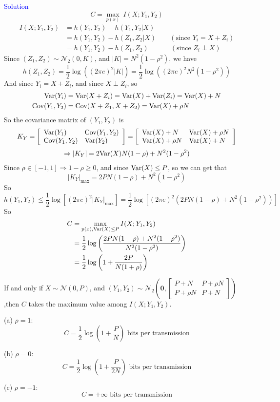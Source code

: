 \textcolor{blue}{Solution}
$$C=\max\limits_{p(x)}\ I(X;Y_1,Y_2)$$
\begin{align*}
I(X;Y_1,Y_2) &= h(Y_1,Y_2) - h(Y_1,Y_2|X) \\
&= h(Y_1,Y_2) - h(Z_1,Z_2|X) \qquad \left(\text{since } Y_i=X+Z_i\right) \\
&= h(Y_1,Y_2) - h(Z_1,Z_2) \qquad\quad\ \left(\text{since } Z_i\perp X\right)
\end{align*}
Since $\left(Z_1,Z_2\right)\sim\mathcal{N}_2(0,K)$, and $|K|=N^2(1-\rho^2)$, we have
$$h(Z_1,Z_2)=\frac{1}{2}\log\left((2\pi e)^2|K|\right)=\frac{1}{2}\log\left((2\pi e)^2 N^2(1-\rho^2)\right)$$
And since $Y_i=X+Z_i$, and since $X\perp Z_i$, so
\begin{align*}
\mathrm{Var}(Y_i) &= \mathrm{Var}(X+Z_i)=\mathrm{Var}(X)+\mathrm{Var}(Z_i)=\mathrm{Var}(X)+N \\
\mathrm{Cov}(Y_1,Y_2) &= \mathrm{Cov}(X+Z_1,X+Z_2)=\mathrm{Var}(X)+\rho N
\end{align*}
So the covariance matrix of $\left(Y_1,Y_2\right)$ is
$$K_Y=\left[\begin{array}{ll}
\mathrm{Var}(Y_1) & \mathrm{Cov}(Y_1,Y_2) \\
\mathrm{Cov}(Y_1,Y_2) & \mathrm{Var}(Y_2)
\end{array}\right]=\left[\begin{array}{ll}
\mathrm{Var}(X)+N & \mathrm{Var}(X)+\rho N \\
\mathrm{Var}(X)+\rho N & \mathrm{Var}(X)+N
\end{array}\right]$$
$$\Rightarrow |K_Y|=2\mathrm{Var}(X)N(1-\rho)+N^2(1-\rho^2)$$
Since $\rho\in[-1,1]\Rightarrow 1-\rho\geq 0$, and since $\mathrm{Var}(X)\leq P$, so we can get that
$$|K_Y|_{\max}=2PN(1-\rho)+N^2(1-\rho^2)$$
So
$$h(Y_1,Y_2)\leq\dfrac{1}{2}\log\left[(2\pi e)^2|K_Y|_{\max}\right]=\dfrac{1}{2}\log\left[(2\pi e)^2\left(2PN(1-\rho)+N^2(1-\rho^2)\right)\right]$$
So
\begin{align*}
C &= \max_{p(x),\mathrm{Var}(X)\leq P} I(X;Y_1,Y_2) \\
&= \dfrac{1}{2}\log\left(\dfrac{2PN(1-\rho)+N^2(1-\rho^2)}{N^2(1-\rho^2)}\right) \\
&= \dfrac{1}{2}\log\left(1+\dfrac{2P}{N(1+\rho)}\right)
\end{align*}

If and only if $X\sim\mathcal{N}(0,P)$, and $(Y_1,Y_2)\sim\mathcal{N}_2\left(\mathbf{0},\left[\begin{array}{ll}
P+N & P+\rho N \\
P+\rho N & P+N
\end{array}\right]\right)$,then $C$ takes the maximum value among $I(X;Y_1,Y_2)$.

(a) $\rho=1:$ \\
$$C = \dfrac{1}{2}\log\left(1+\dfrac{P}{N}\right) \text{ bits per transmission}$$

(b) $\rho=0:$ \\
$$C = \dfrac{1}{2}\log\left(1+\dfrac{P}{2N}\right) \text{ bits per transmission}$$

(c) $\rho=-1:$ \\
$$C = +\infty \text{ bits per transmission}$$

\newpage